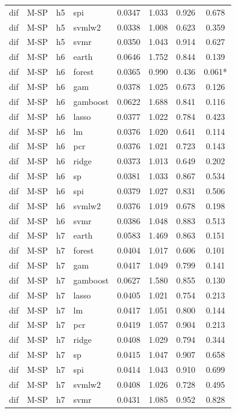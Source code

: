 \begin{ThreePartTable}
\begin{longtable}[t]{llclcccc}
dif & M-SP & h5 & spi & 0.0347 & 1.033 & 0.926 & 0.678\\
dif & M-SP & h5 & svmlw2 & 0.0338 & 1.008 & 0.623 & 0.359\\
dif & M-SP & h5 & svmr & 0.0350 & 1.043 & 0.914 & 0.627\\
\addlinespace
dif & M-SP & h6 & earth & 0.0646 & 1.752 & 0.844 & 0.139\\
dif & M-SP & h6 & forest & 0.0365 & 0.990 & 0.436 & 0.061*\\
dif & M-SP & h6 & gam & 0.0378 & 1.025 & 0.673 & 0.126\\
dif & M-SP & h6 & gamboost & 0.0622 & 1.688 & 0.841 & 0.116\\
dif & M-SP & h6 & lasso & 0.0377 & 1.022 & 0.784 & 0.423\\
dif & M-SP & h6 & lm & 0.0376 & 1.020 & 0.641 & 0.114\\
dif & M-SP & h6 & pcr & 0.0376 & 1.021 & 0.723 & 0.143\\
dif & M-SP & h6 & ridge & 0.0373 & 1.013 & 0.649 & 0.202\\
dif & M-SP & h6 & sp & 0.0381 & 1.033 & 0.867 & 0.534\\
dif & M-SP & h6 & spi & 0.0379 & 1.027 & 0.831 & 0.506\\
dif & M-SP & h6 & svmlw2 & 0.0376 & 1.019 & 0.678 & 0.198\\
dif & M-SP & h6 & svmr & 0.0386 & 1.048 & 0.883 & 0.513\\
\addlinespace
dif & M-SP & h7 & earth & 0.0583 & 1.469 & 0.863 & 0.151\\
dif & M-SP & h7 & forest & 0.0404 & 1.017 & 0.606 & 0.101\\
dif & M-SP & h7 & gam & 0.0417 & 1.049 & 0.799 & 0.141\\
dif & M-SP & h7 & gamboost & 0.0627 & 1.580 & 0.855 & 0.130\\
dif & M-SP & h7 & lasso & 0.0405 & 1.021 & 0.754 & 0.213\\
dif & M-SP & h7 & lm & 0.0417 & 1.051 & 0.800 & 0.144\\
dif & M-SP & h7 & pcr & 0.0419 & 1.057 & 0.904 & 0.213\\
dif & M-SP & h7 & ridge & 0.0408 & 1.029 & 0.794 & 0.344\\
dif & M-SP & h7 & sp & 0.0415 & 1.047 & 0.907 & 0.658\\
dif & M-SP & h7 & spi & 0.0414 & 1.043 & 0.910 & 0.699\\
dif & M-SP & h7 & svmlw2 & 0.0408 & 1.026 & 0.728 & 0.495\\
dif & M-SP & h7 & svmr & 0.0431 & 1.085 & 0.952 & 0.828\\

\end{longtable}
\end{ThreePartTable}
